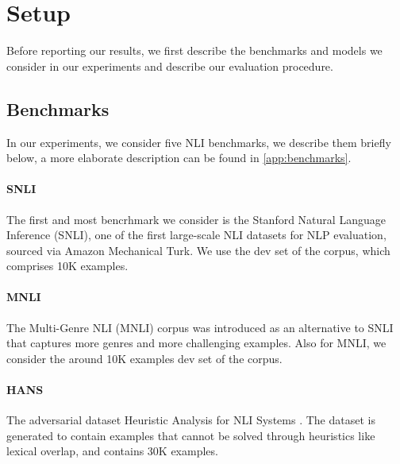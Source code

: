 \section{Setup}

Before reporting our results, we first describe the benchmarks and models we consider in our experiments and describe our evaluation procedure.

\subsection{Benchmarks}
In our experiments, we consider five NLI benchmarks, we describe them briefly below, a more elaborate description can be found in \cref{app:benchmarks}. 

\vspace{-1mm}
\paragraph{SNLI}
The first and most bencrhmark we consider is the Stanford Natural Language Inference (SNLI), one of the first large-scale NLI datasets for NLP evaluation, sourced via Amazon Mechanical Turk.
We use the dev set of the corpus, which comprises 10K examples.

\vspace{-1mm}
\paragraph{MNLI}
The Multi-Genre NLI (MNLI) corpus \citep{williams-etal-2018-broad} was introduced as an alternative to SNLI that captures more genres and more challenging examples. 
Also for MNLI, we consider the around 10K examples dev set of the corpus.

\vspace{-1mm}
\paragraph{HANS}
The adversarial dataset Heuristic Analysis for NLI Systems \citep[HANS,][]{mccoy-etal-2019-right}.
The dataset is generated to contain examples that cannot be solved through heuristics like lexical overlap, and contains 30K examples.

